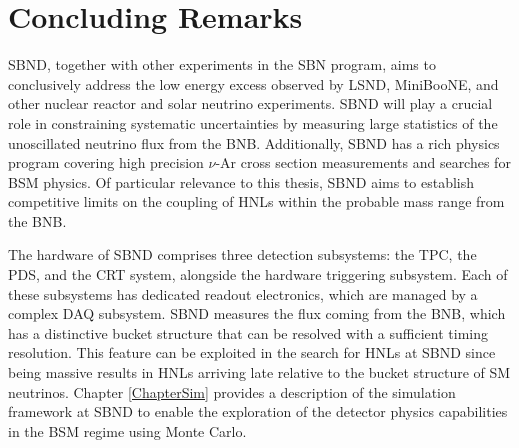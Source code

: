 
\section{Concluding Remarks}
\label{sec:sbnd_conclude}

SBND, together with other experiments in the SBN program, aims to conclusively address the low energy excess observed by LSND, MiniBooNE, and other nuclear reactor and solar neutrino experiments. 
SBND will play a crucial role in constraining systematic uncertainties by measuring large statistics of the unoscillated neutrino flux from the BNB.
Additionally, SBND has a rich physics program covering high precision $\nu$-Ar cross section measurements and searches for BSM physics. 
Of particular relevance to this thesis, SBND aims to establish competitive limits on the coupling of HNLs within the probable mass range from the BNB.

The hardware of SBND comprises three detection subsystems: the TPC, the PDS, and the CRT system, alongside the hardware triggering subsystem. 
Each of these subsystems has dedicated readout electronics, which are managed by a complex DAQ subsystem.
SBND measures the flux coming from the BNB, which has a distinctive bucket structure that can be resolved with a sufficient timing resolution. 
This feature can be exploited in the search for HNLs at SBND since being massive results in HNLs arriving late relative to the bucket structure of SM neutrinos. 
Chapter \ref{ChapterSim} provides a description of the simulation framework at SBND to enable the exploration of the detector physics capabilities in the BSM regime using Monte Carlo.  


